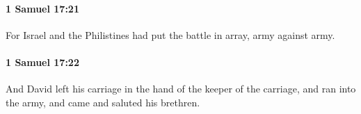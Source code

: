 		\paragraph{1 Samuel 17:21} %
			\label{1SAMUEL-17-21}

			For Israel and the Philistines had put the battle in array, army against army.


		\paragraph{1 Samuel 17:22} %
			\label{1SAMUEL-17-22}

			And David left his carriage in the hand of the keeper of the carriage, and ran into the army, and came and saluted his brethren.


